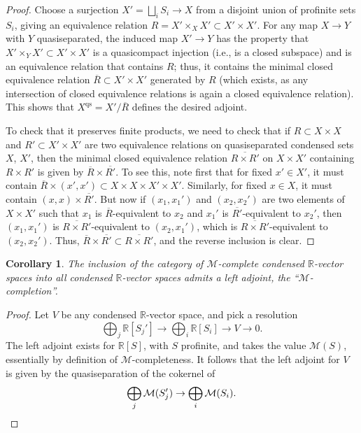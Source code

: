 \documentclass[11pt]{amsbook}
\numberwithin{equation}{section}
\numberwithin{theorem}{section}
\newtheorem{corollary}[theorem]{Corollary}
\theoremstyle{definition}
\begin{document}
\begin{proof} Choose a surjection $X'=\bigsqcup_i S_i\to X$ from a disjoint union of profinite sets $S_i$, giving an equivalence relation $R=X'\times_X X'\subset X'\times X'$. For any map $X\to Y$ with $Y$ quasiseparated, the induced map $X'\to Y$ has the property that $X'\times_Y X'\subset X'\times X'$ is a quasicompact injection (i.e., is a closed subspace) and is an equivalence relation that contains $R$; thus, it contains the minimal closed equivalence relation $\overline{R}\subset X'\times X'$ generated by $R$ (which exists, as any intersection of closed equivalence relations is again a closed equivalence relation). This shows that $X^{\mathrm{qs}} = X'/\overline{R}$ defines the desired adjoint.

To check that it preserves finite products, we need to check that if $R\subset X\times X$ and $R'\subset X'\times X'$ are two equivalence relations on quasiseparated condensed sets $X$, $X'$, then the minimal closed equivalence relation $\overline{R\times R'}$ on $X\times X'$ containing $R\times R'$ is given by $\overline{R}\times \overline{R'}$. To see this, note first that for fixed $x'\in X'$, it must contain $\overline{R}\times (x',x')\subset X\times X\times X'\times X'$. Similarly, for fixed $x\in X$, it must contain $(x,x)\times \overline{R'}$. But now if $(x_1,x_1')$ and $(x_2,x_2')$ are two elements of $X\times X'$ such that $x_1$ is $\overline{R}$-equivalent to $x_2$ and $x_1'$ is $\overline{R'}$-equivalent to $x_2'$, then $(x_1,x_1')$ is $\overline{R\times R'}$-equivalent to $(x_2,x_1')$, which is $\overline{R\times R'}$-equivalent to $(x_2,x_2')$. Thus, $\overline{R}\times \overline{R'}\subset \overline{R\times R'}$, and the reverse inclusion is clear.
\end{proof}

\begin{corollary} The inclusion of the category of $\mathcal M$-complete condensed $\mathbb R$-vector spaces into all condensed $\mathbb R$-vector spaces admits a left adjoint, the ``$\mathcal M$-completion''.
\end{corollary}

\begin{proof} Let $V$ be any condensed $\mathbb R$-vector space, and pick a resolution
\[
\bigoplus_j \mathbb R[S_j']\to \bigoplus_i \mathbb R[S_i]\to V\to 0.
\]
The left adjoint exists for $\mathbb R[S]$, with $S$ profinite, and takes the value $\mathcal M(S)$, essentially by definition of $\mathcal M$-completeness. It follows that the left adjoint for $V$ is given by the quasiseparation of the cokernel of
\[
\bigoplus_j \mathcal M(S_j')\to \bigoplus_i \mathcal M(S_i).\qedhere
\]
\end{proof}
\end{document}
